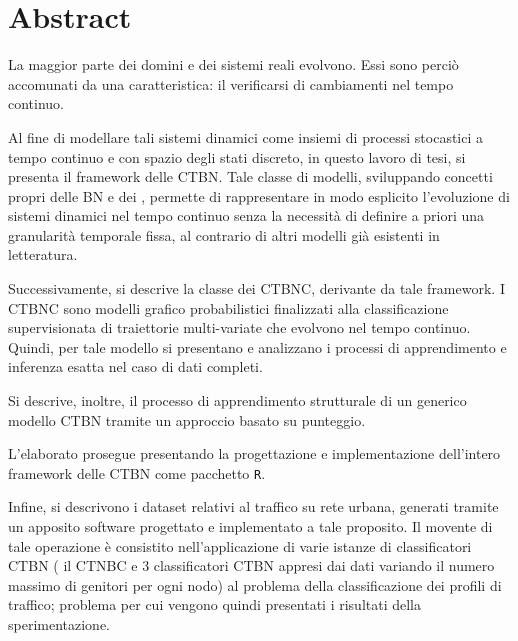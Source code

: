 
\cleardoublepage
{}
{}
\chapter*{Abstract}
La maggior parte dei domini e dei sistemi reali evolvono. Essi sono perciò accomunati da una caratteristica: il verificarsi di cambiamenti nel tempo continuo.

Al fine di modellare tali sistemi dinamici come insiemi di processi stocastici a tempo continuo e con spazio degli stati discreto, in questo lavoro di tesi, si presenta il framework delle \acf{CTBN}. Tale classe di modelli, sviluppando concetti propri delle \acf{BN} e dei \mprocess{}, permette di rappresentare in modo esplicito l'evoluzione di sistemi dinamici nel tempo continuo senza la necessità di definire a priori una granularità temporale fissa, al contrario di altri modelli già esistenti in letteratura.

Successivamente, si descrive la classe dei \acf{CTBNC}, derivante da tale framework. I \acs{CTBNC} sono modelli grafico probabilistici finalizzati alla classificazione supervisionata di traiettorie multi-variate che evolvono nel tempo continuo. Quindi, per tale modello si presentano e analizzano i processi di apprendimento e inferenza esatta nel caso di dati completi.

Si descrive, inoltre, il processo di apprendimento strutturale di un generico modello \acs{CTBN} tramite un approccio basato su punteggio.

L'elaborato prosegue presentando la progettazione e implementazione dell'intero framework delle \acs{CTBN} come pacchetto \lstinline$R$.

Infine, si descrivono i dataset relativi al traffico su rete urbana, generati tramite un apposito software progettato e implementato a tale proposito. Il movente di tale operazione è consistito nell'applicazione di varie istanze di classificatori \acs{CTBN} (\ie{} il \acf{CTNBC} e $3$ classificatori \acs{CTBN} appresi dai dati variando il numero massimo di genitori per ogni nodo) al problema della classificazione dei profili di traffico; problema per cui vengono quindi presentati i risultati della sperimentazione.

\vfill

